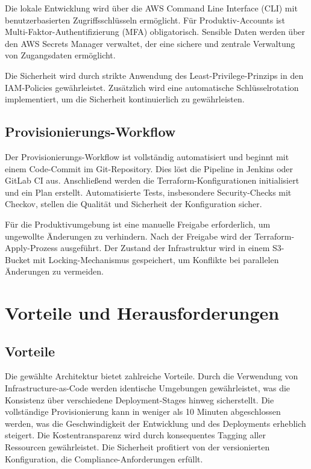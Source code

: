 Die lokale Entwicklung wird über die AWS Command Line Interface (CLI)
mit benutzerbasierten Zugriffsschlüsseln ermöglicht. Für Produktiv-Accounts ist
Multi-Faktor-Authentifizierung (MFA) obligatorisch. Sensible Daten werden
über den AWS Secrets Manager verwaltet, der eine sichere und zentrale
Verwaltung von Zugangsdaten ermöglicht.

Die Sicherheit wird durch strikte Anwendung des Least-Privilege-Prinzips
in den IAM-Policies gewährleistet. Zusätzlich wird eine automatische
Schlüsselrotation implementiert, um die Sicherheit kontinuierlich zu
gewährleisten.

\subsection{Provisionierungs-Workflow}
Der Provisionierungs-Workflow ist vollständig automatisiert und 
beginnt mit einem Code-Commit im Git-Repository. Dies löst die Pipeline in
Jenkins oder GitLab CI aus. Anschließend werden die Terraform-Konfigurationen 
initialisiert und ein Plan erstellt. Automatisierte Tests, insbesondere
Security-Checks mit Checkov, stellen die Qualität und Sicherheit der Konfiguration
sicher.

Für die Produktivumgebung ist eine manuelle Freigabe erforderlich,
um ungewollte Änderungen zu verhindern. Nach der Freigabe wird der
Terraform-Apply-Prozess ausgeführt. Der Zustand der Infrastruktur wird
in einem S3-Bucket mit Locking-Mechanismus gespeichert, um Konflikte bei
parallelen Änderungen zu vermeiden.

\section{Vorteile und Herausforderungen}
\subsection{Vorteile} 
Die gewählte Architektur bietet zahlreiche Vorteile. Durch die Verwendung von
Infrastructure-as-Code werden identische Umgebungen gewährleistet, was die
Konsistenz über verschiedene Deployment-Stages hinweg sicherstellt. Die
vollständige Provisionierung kann in weniger als 10 Minuten abgeschlossen
werden, was die Geschwindigkeit der Entwicklung und des Deployments erheblich
steigert. Die Kostentransparenz wird durch konsequentes Tagging aller
Ressourcen gewährleistet. Die Sicherheit profitiert von der versionierten
Konfiguration, die Compliance-Anforderungen erfüllt.

